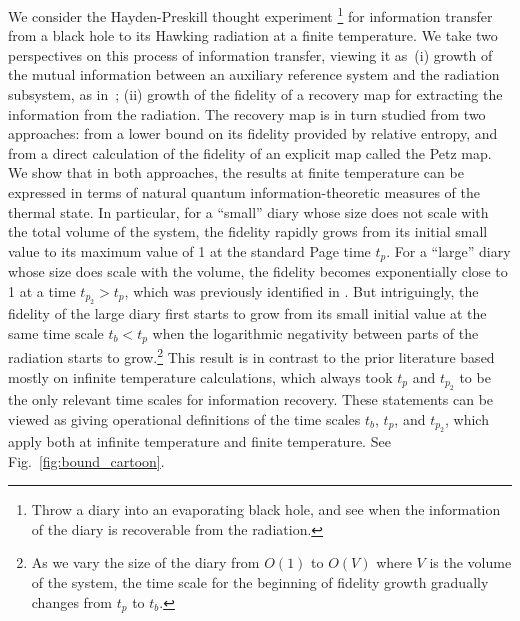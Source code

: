 \documentclass[a4paper,11pt]{article}
\newcommand*{\JKF}[1]{\textcolor{blue}{#1}}
\newcommand{\SV}[1]{\textcolor{red}{#1}}
\begin{document}
 
 \item We consider the Hayden-Preskill thought experiment \cite{2007JHEP...09..120H}\footnote{Throw a diary into an evaporating black hole, and see when the information of the diary is recoverable from the radiation.} for information transfer from a black hole to its Hawking radiation at a finite temperature. We take two perspectives on this process of information transfer, viewing it as~(i) growth of the mutual information between an auxiliary reference system and the radiation subsystem, as in~\cite{2007JHEP...09..120H}; (ii) growth of the fidelity of a recovery map for extracting the information from the radiation. The recovery map is in turn studied from two approaches: from a lower bound on its fidelity provided by relative entropy, and from a direct calculation of the fidelity of an explicit map called the Petz map. We show that in both approaches, the results at finite temperature can be expressed in terms of natural quantum information-theoretic measures of the thermal state. 
In particular, for a ``small'' diary whose size does not scale with the total volume of the system, the fidelity rapidly grows from its initial small value to its maximum value of 1 at the standard Page time $t_p$. For a ``large'' diary whose size does scale with the volume, the fidelity becomes exponentially close to 1 at a time $t_{p_2} > t_p$, which was previously identified in \cite{2019JHEP...12..007H}. But intriguingly, the fidelity of the large diary first starts to grow from its small initial value at the same time scale $t_b < t_p$ when the logarithmic negativity between parts of the radiation starts to grow.\footnote{As we vary the size of the diary from $O(1)$ to $O(V)$ where $V$ is the volume of the system, the time scale for the beginning of fidelity growth gradually changes from $t_p$ to $t_b$.} This result is in contrast to the prior literature based mostly on infinite temperature calculations, which always took $t_p$ and $t_{p_2}$ to be the only relevant time scales for information recovery. These statements can be viewed as giving operational definitions of the time scales $t_b$, $t_p$, and $t_{p_2}$, which apply both at infinite temperature and finite temperature. See Fig.~\ref{fig:bound_cartoon}.
 
\end{document}
